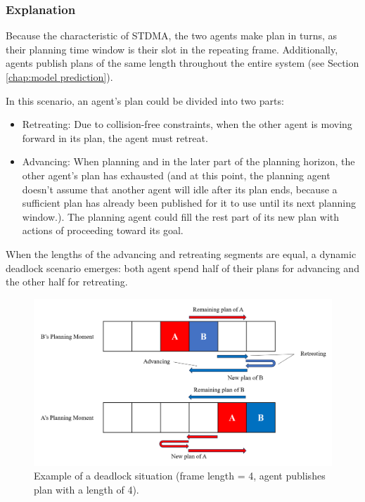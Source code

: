 \subsubsection{Explanation}

Because the characteristic of STDMA, the two agents make plan in turns, as their planning time window is their slot in the repeating frame.
Additionally, agents publish plans of the same length throughout the entire system (see Section \ref{chap:model prediction}).

In this scenario, an agent's plan could be divided into two parts:
\begin{itemize}
    \item Retreating: Due to collision-free constraints, when the other agent is moving forward in its plan, the agent must retreat.
    \item Advancing: When planning and in the later part of the planning horizon, the other agent's plan has exhausted (and at this point, the planning agent doesn't assume that another agent will idle after its plan ends, because a sufficient plan has already been published for it to use until its next planning window.). The planning agent could fill the rest part of its new plan with actions of proceeding toward its goal.
\end{itemize}

When the lengths of the advancing and retreating segments are equal, a dynamic deadlock scenario emerges: 
both agent spend half of their plans for advancing and the other half for retreating.



\begin{figure}[htbp]
    \centering
    \includegraphics[width = \linewidth]{figures/deaclock_1.png}
    \caption{Example of a deadlock situation (frame length = 4, agent publishes plan with a length of 4).}%
    \label{fig:deadlock}
\end{figure}

